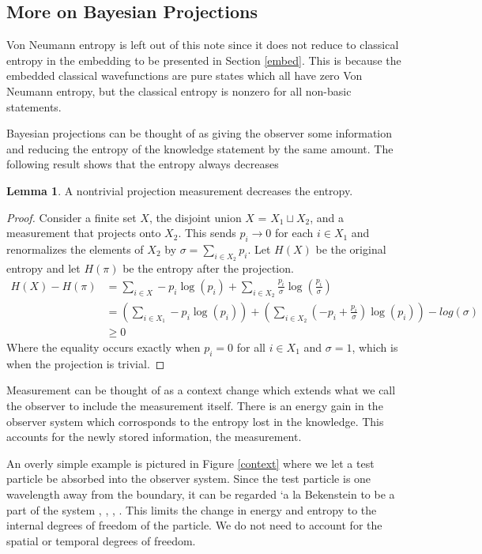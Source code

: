 \documentclass[12pt,a4paper]{article}
\theoremstyle{myrule}
\theoremstyle{postulate}
\theoremstyle{definition}
\newtheorem{lemma}[theorem]{Lemma}
\begin{document}
\subsection{More on Bayesian Projections}
\label{entropy}
Von Neumann entropy is left out of this note since it does not reduce to classical entropy in the embedding to be presented in Section \ref{embed}.  This is because the embedded classical wavefunctions are pure states which all have zero Von Neumann entropy, but the classical entropy is nonzero for all non-basic statements.

Bayesian projections can be thought of as giving the observer some information and reducing the entropy of the knowledge statement by the same amount.  The following result shows that the entropy always decreases

\begin{lemma}
A nontrivial projection measurement decreases the entropy.
\end{lemma}
\begin{proof}
Consider a finite set $X$, the disjoint union $X$ = $X_1 \sqcup X_2$, and a measurement that projects onto $X_2$.  This sends $p_i \rightarrow 0$ for each $i \in X_1$ and renormalizes the elements of $X_2$ by $\sigma = \sum_{i \in X_2} p_i$.  Let $H(X)$ be the original entropy and let $H(\pi)$ be the entropy after the projection.
\[
\begin{split}
H(X) - H(\pi) &= \sum_{i \in X} - p_i \log(p_i) + \sum_{i \in X_2} \frac{p_i}{\sigma} \log\left(\frac{p_i}{\sigma}\right) \\
              &= \left(\sum_{i \in X_1} - p_i \log(p_i)\right) + \left(\sum_{i \in X_2} \left(-p_i + \frac{p_i}{\sigma}\right) \log(p_i) \right) - log(\sigma) \\
              &\ge 0
\end{split}
\]
Where the equality occurs exactly when $p_i = 0$ for all $i \in X_1$ and $\sigma = 1$, which is when the projection is trivial. 
\end{proof}

Measurement can be thought of as a context change which extends what we call the observer to include the measurement itself.  There is an energy gain in the observer system which corrosponds to the entropy lost in the knowledge.  This accounts for the newly stored information, the measurement.

An overly simple example is pictured in Figure \ref{context} where we let a test particle be absorbed into the observer system.  Since the test particle is one wavelength away from the boundary, it can be regarded \a`a la Bekenstein to be a part of the system \cite{entropic}, \cite{bekenstein}, \cite{matterchannels}, \cite{thrust}.  This limits the change in energy and entropy to the internal degrees of freedom of the particle.   We do not need to account for the spatial or temporal degrees of freedom.
\end{document}
